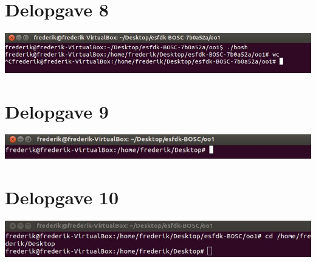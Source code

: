 \section{Delopgave 8}
\includegraphics{Images/TestOfPart8}
\label{Test8}

\section{Delopgave 9}
\includegraphics{Images/TestOfPart9}
\label{Test9}

\section{Delopgave 10}
\includegraphics{Images/TestOfPart10}
\label{Test10}